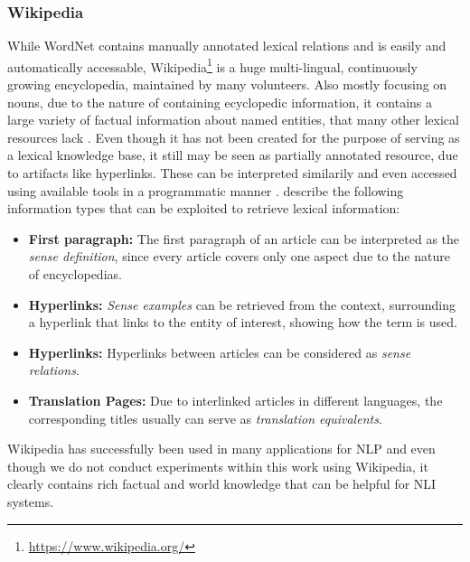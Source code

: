 \subsubsection{Wikipedia}\label{sec:wikipedia}
While WordNet contains manually annotated lexical relations and is easily and automatically accessable, Wikipedia\footnote{\href{https://www.wikipedia.org/}{https://www.wikipedia.org/}} is a huge multi-lingual, continuously growing  encyclopedia, maintained by many volunteers. Also mostly focusing on nouns, due to the nature of containing ecyclopedic information, it contains a large variety of factual information about named entities, that many other lexical resources lack \citep{gurevych2016linked}. Even though it has not been created for the purpose of serving as a lexical knowledge base, it still may be seen as  partially annotated resource, due to artifacts like hyperlinks. These can be interpreted similarily and even accessed using available tools in a programmatic manner \citep{zesch2008extracting}.  \cite{gurevych2016linked} describe the following information types that can be exploited to retrieve lexical information:
\begin{itemize}
\item \textbf{First paragraph:} The first paragraph of an article can be interpreted as the \textit{sense definition}, since every article covers only one aspect due to the nature of encyclopedias.
\item \textbf{Hyperlinks:} \textit{Sense examples} can be retrieved from the context, surrounding a hyperlink that links to the entity of interest, showing how the term is used.
\item \textbf{Hyperlinks:} Hyperlinks between articles can be considered as \textit{sense relations}.
\item \textbf{Translation Pages:} Due to interlinked articles in different languages, the corresponding titles usually can serve as \textit{translation equivalents}.
\end{itemize}
Wikipedia has successfully been used in many applications for \ac{NLP} and even though we do not conduct experiments within this work using Wikipedia, it clearly contains rich factual and world knowledge that can be helpful for \ac{NLI} systems. 
